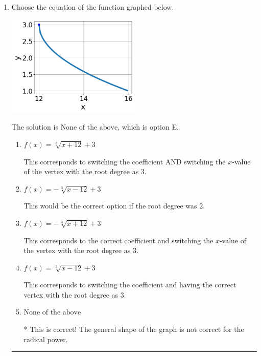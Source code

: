 \documentclass{extbook}[14pt]
\newcommand{\litem}[1]{\item #1

\rule{\textwidth}{0.4pt}}
\begin{document}
\begin{enumerate}\litem{
Choose the equation of the function graphed below.

\begin{center}
    \includegraphics[width=0.5\textwidth]{../Figures/radicalGraphToEquationB.png}
\end{center}


The solution is \( \text{None of the above} \), which is option E.\begin{enumerate}[label=\Alph*.]
\item \( f(x) = \sqrt[3]{x + 12} + 3 \)

This corresponds to switching the coefficient AND switching the $x$-value of the vertex with the root degree as $3$.
\item \( f(x) = - \sqrt[3]{x - 12} + 3 \)

This would be the correct option if the root degree was $2$.
\item \( f(x) = - \sqrt[3]{x + 12} + 3 \)

This corresponds to the correct coefficient and switching the $x$-value of the vertex with the root degree as $3$.
\item \( f(x) = \sqrt[3]{x - 12} + 3 \)

This corresponds to switching the coefficient and having the correct vertex with the root degree as $3$.
\item \( \text{None of the above} \)

* This is correct! The general shape of the graph is not correct for the radical power.
\end{enumerate}

}
\end{enumerate}
\end{document}
